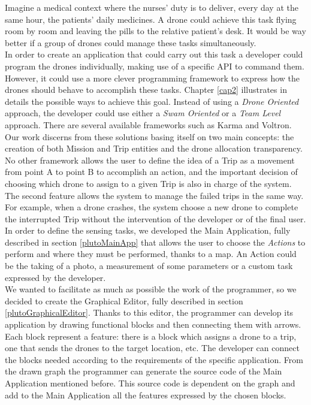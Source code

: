 Imagine a medical context where the nurses' duty is to deliver, every day at the same hour, the patients' daily medicines.
A drone could achieve this task flying room by room and leaving the pills to the relative patient's desk. 
It would be way better if a group of drones could manage these tasks simultaneously.
\\

In order to create an application that could carry out this task a developer could program the drones individually, making use of a specific API to command them. 
However, it could use a more clever programming framework to express how the drones should behave to accomplish these tasks.
Chapter \ref{cap2} illustrates in details the possible ways to achieve this goal.
Instead of using a \textit{Drone Oriented} approach, the developer could use either a \textit{Swam Oriented} or a \textit{Team Level} approach. 
There are several available frameworks such as Karma\cite{karma} and Voltron\cite{voltron}.
\\

Our work discerns from these solutions basing itself on two main concepts: the creation of both Mission and Trip entities and the drone allocation transparency. 
No other framework allows the user to define the idea of a Trip as a movement from point A to point B to accomplish an action, and the important decision of choosing which drone to assign to a given Trip is also in charge of the system.
The second feature allows the system to manage the failed trips in the same way.
For example, when a drone crashes, the system choose a new drone to complete the interrupted Trip without the intervention of the developer or of the final user.
\\

In order to define the sensing tasks, we developed the Main Application, fully described in section \ref{plutoMainApp} that allows  the user to choose the \textit{Actions} to perform and where they must be performed, thanks to a map. 
An Action could be the taking of a photo, a measurement of some parameters or a custom task expressed by the developer.
\\

We wanted to facilitate as much as possible the work of the programmer, so we decided to create the Graphical Editor, fully described in section \ref{plutoGraphicalEditor}.
Thanks to this editor, the programmer can develop its application by drawing functional blocks and then connecting them with arrows.
\\
Each block represent a feature: there is a block which assigns a drone to a trip, one that sends the drones to the target location, etc.
The developer can connect the blocks needed according to the requirements of the specific application.
From the drawn graph the programmer can generate the source code of the Main Application mentioned before. This source code is dependent on the graph and add to the Main Application all the features expressed by the chosen blocks.
\\

